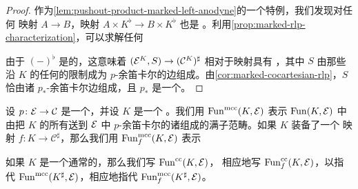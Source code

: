 \begin{proof}
作为\cref{lem:pushout-product-marked-left-anodyne}的一个特例，我们发现对任何%
\trMarkedLeftAnodyne{}映射 $A \to B$，映射 $A \times K^\flat \to B \times K^\flat$ 也是%
\trMarkedLeftAnodyne。利用\cref{prop:marked-rlp-characterization}，可以求解任何%
\trLiftingProblem{}%
\begin{center}
\end{center}
由于 $(-)^\flat$ 是\trForgetfulFunctor{}的\trLeftAdjoint{}，这意味着
$(\mathcal{E}^K, S) \to (\mathcal{C}^K)^\sharp$ 相对于\trMarkedAnodyne{}映射具有%
\trRightLiftingProperty{}，其中 $S$ 由那些沿 $K$ 的任何\trObject{}的限制成为
$p$-余笛卡尔的边组成。由\cref{cor:marked-cocartesian-rlp}，$S$ 恰由诸
$p_*$-余笛卡尔边组成，且 $p_*$ 是一个\trCocartesianFibration{}。
\end{proof}

\begin{definition}\label{def:fun-mcc}
设 $p\colon \mathcal{E} \to \mathcal{C}$ 是一个\trCocartesianFibration{}，并设 $K$ 是一个%
\trMarkedSimplicialSet{}。我们用 $\mathrm{Fun}^{\mathrm{mcc}}(K, \mathcal{E})$ 表示
$\mathrm{Fun}(K, \mathcal{E})$ 中由把 $K$ 的所有\trMorphism{}送到 $\mathcal{E}$ 中
$p$-余笛卡尔\trMorphism{}的诸\trFunctor{}组成的满子范畴。如果 $K$ 装备了一个
映射 $f\colon K \to \mathcal{C}^\sharp$，那么我们用
$\mathrm{Fun}^{\mathrm{mcc}}_f(K, \mathcal{E})$ 表示\trPullback{}%
\begin{center}
\end{center}
如果 $K$ 是一个通常的\trSimplicialSet{}，那么我们写 $\mathrm{Fun}^{\mathrm{cc}}(K, \mathcal{E})$，
相应地写 $\mathrm{Fun}^{\mathrm{cc}}_f(K, \mathcal{E})$，以指代
$\mathrm{Fun}^{\mathrm{mcc}}(K^\sharp, \mathcal{E})$，相应地指代
$\mathrm{Fun}^{\mathrm{mcc}}_f(K^\sharp, \mathcal{E})$。
\end{definition}

